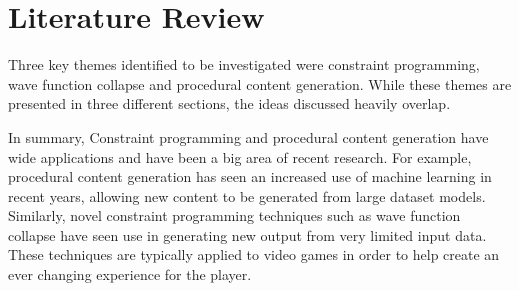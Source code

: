 \chapter{Literature Review}





Three key themes identified to be investigated were constraint programming, wave function collapse and procedural content generation. While these themes are presented in three different sections, the ideas discussed heavily overlap.

In summary, Constraint programming and procedural content generation have wide applications and have been a big area of recent research. For example, procedural content generation has seen an increased use of machine learning in recent years, allowing new content to be generated from large dataset models. Similarly, novel constraint programming techniques such as wave function collapse have seen use in generating new output from very limited input data. These techniques are typically applied to video games in order to help create an ever changing experience for the player.

